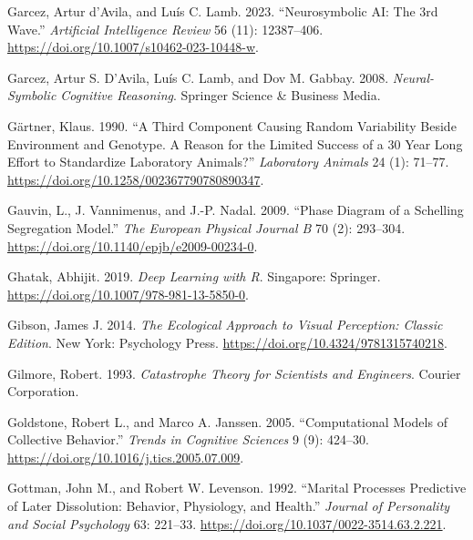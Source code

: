 \documentclass[
  a4paper,
  DIV=11,
  numbers=noendperiod,
  oneside]{scrreprt}
\newlength{\cslhangindent}
\newlength{\cslentryspacingunit} %
\newenvironment{CSLReferences}[2] %
 {%
  \setlength{\parindent}{0pt}
  \ifodd #1
  \let\oldpar\par
  \def\par{\hangindent=\cslhangindent\oldpar}
  \fi
  \setlength{\parskip}{#2\cslentryspacingunit}
 }%
 {}
\begin{document}
\begin{CSLReferences}{1}{0}
\leavevmode{}%
Garcez, Artur d'Avila, and Luís C. Lamb. 2023. {``Neurosymbolic AI: The
3rd Wave.''} \emph{Artificial Intelligence Review} 56 (11): 12387--406.
\url{https://doi.org/10.1007/s10462-023-10448-w}.

\leavevmode{}%
Garcez, Artur S. D'Avila, Luís C. Lamb, and Dov M. Gabbay. 2008.
\emph{Neural-{Symbolic Cognitive Reasoning}}. {Springer Science \&
Business Media}.

\leavevmode{}%
Gärtner, Klaus. 1990. {``A Third Component Causing Random Variability
Beside Environment and Genotype. {A} Reason for the Limited Success of a
30 Year Long Effort to Standardize Laboratory Animals?''}
\emph{Laboratory Animals} 24 (1): 71--77.
\url{https://doi.org/10.1258/002367790780890347}.

\leavevmode{}%
Gauvin, L., J. Vannimenus, and J.-P. Nadal. 2009. {``Phase Diagram of a
{Schelling} Segregation Model.''} \emph{The European Physical Journal B}
70 (2): 293--304. \url{https://doi.org/10.1140/epjb/e2009-00234-0}.

\leavevmode{}%
Ghatak, Abhijit. 2019. \emph{Deep {Learning} with {R}}. {Singapore}:
{Springer}. \url{https://doi.org/10.1007/978-981-13-5850-0}.

\leavevmode{}%
Gibson, James J. 2014. \emph{The {Ecological Approach} to {Visual
Perception}: {Classic Edition}}. {New York}: {Psychology Press}.
\url{https://doi.org/10.4324/9781315740218}.

\leavevmode{}%
Gilmore, Robert. 1993. \emph{Catastrophe {Theory} for {Scientists} and
{Engineers}}. {Courier Corporation}.

\leavevmode{}%
Goldstone, Robert L., and Marco A. Janssen. 2005. {``Computational
Models of Collective Behavior.''} \emph{Trends in Cognitive Sciences} 9
(9): 424--30. \url{https://doi.org/10.1016/j.tics.2005.07.009}.

\leavevmode{}%
Gottman, John M., and Robert W. Levenson. 1992. {``Marital Processes
Predictive of Later Dissolution: {Behavior}, Physiology, and Health.''}
\emph{Journal of Personality and Social Psychology} 63: 221--33.
\url{https://doi.org/10.1037/0022-3514.63.2.221}.


\end{CSLReferences}
\end{document}
